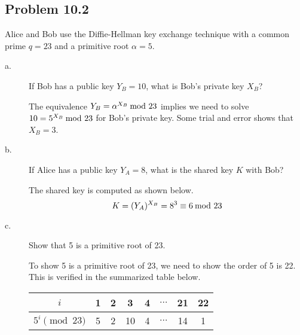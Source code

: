 \documentclass[../hw_sols.tex]{subfiles}
\begin{document}

\subsection*{Problem 10.2}

Alice and Bob use the Diffie-Hellman key exchange technique with a common 
prime $q = 23$ and a primitive root $\alpha = 5$.

\begin{description}

\item[a.] If Bob has a public key $Y_B = 10$, what is Bob's private key $X_B$?

\begin{solution}
The equivalence $Y_B = \alpha^{X_B} \tmod{23}$ implies we need to solve 
$10 = 5^{X_B} \tmod{23}$ for Bob's private key. Some trial and error shows 
that $X_B = 3$.
\end{solution}

\item[b.] If Alice has a public key $Y_A = 8$, what is the shared key $K$ 
with Bob?

\begin{solution}
The shared key is computed as shown below.
	\[ K = (Y_A)^{X_B} = 8^3 \equiv 6 \tmod{23} \]
\end{solution}

\item[c.] Show that 5 is a primitive root of 23.

\begin{solution}
To show 5 is a primitive root of 23, we need to show the order of 5 is 22. 
This is verified in the summarized table below.
\begin{center}
\begin{tabular}{ c | *{7}{c} }
	$i$ & 1 & 2 & 3 & 4 & $\dots$ & 21 & 22 \\
	\hline
	$5^i \pmod{23}$ & 5 & 2 & 10 & 4 & $\dots$ & 14 & 1
\end{tabular}
\end{center}
\end{solution}

\end{description}
\end{document}

